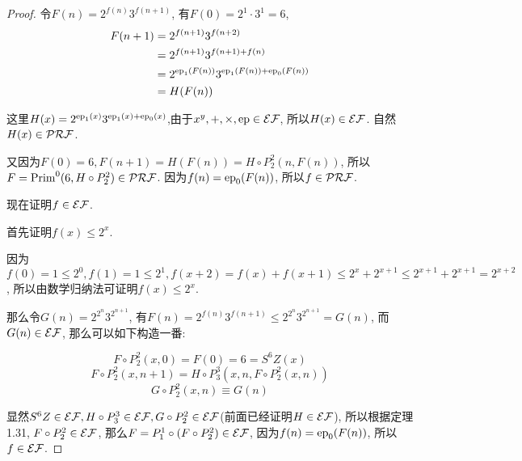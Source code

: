 \begin{proof}
    令$F(n)=2^{f(n)}3^{f(n+1)}$, 有$F(0)=2^1\cdot 3^1=6$,
    $$\begin{aligned}
        F(n+1)&=2^{f(n+1)}3^{f(n+2)}\\
        &=2^{f(n+1)}3^{f(n+1)+f(n)}\\
        &=2^{\mathrm{ep}_1(F(n))}3^{\mathrm{ep}_1(F(n))+\mathrm{ep}_0(F(n))}\\
        &=H(F(n))
    \end{aligned}$$
	
    这里$H(x)=2^{\mathrm{ep}_1(x)}3^{\mathrm{ep}_1(x)+\mathrm{ep}_0(x)}$,由于$x^y,+,\times,\mathrm{ep}\in\mathcal{EF}$, 所以$H(x)\in\mathcal{EF}$. 自然$H(x)\in\mathcal{PRF}$.

    又因为$F(0)=6,F(n+1)=H(F(n))=H\circ P_2^2(n,F(n))$, 所以$F=\mathrm{Prim}^0(6,H\circ P_2^2)\in\mathcal{PRF}$. 因为$f(n)=\mathrm{ep}_0(F(n))$, 所以$f\in\mathcal{PRF}$.

    现在证明$f\in\mathcal{EF}$.

    首先证明$f(x)\leqslant 2^x$.
    
    因为$f(0)=1\leqslant2^0,f(1)=1\leqslant2^1,f(x+2)=f(x)+f(x+1)\leqslant2^x+2^{x+1}\leq2^{x+1}+2^{x+1}=2^{x+2}$, 所以由数学归纳法可证明$f(x)\leqslant 2^x$.

    那么令$G(n)=2^{2^n}3^{2^{n+1}}$, 有$F(n)=2^{f(n)}3^{f(n+1)}\leqslant2^{2^n}3^{2^{n+1}}=G(n)$, 而$G(n)\in\mathcal{EF}$, 那么可以如下构造一番:

    $$F\circ P^2_2(x, 0)=F(0)=6=S^6Z(x)$$
    $$F\circ P^2_2(x, n+1)=H\circ P_3^3(x, n, F\circ P^2_2(x,n))$$
    $$G\circ P^2_2(x, n)\equiv G(n)$$

    显然$S^6Z\in\mathcal{EF},H\circ P_3^3\in\mathcal{EF},G\circ P^2_2\in\mathcal{EF}$(前面已经证明$H\in\mathcal{EF}$), 所以根据定理1.31, $F\circ P^2_2\in\mathcal{EF}$, 那么$F=P_1^1\circ (F\circ P^2_2)\in\mathcal{EF}$, 因为$f(n)=\mathrm{ep}_0(F(n))$, 所以$f\in\mathcal{EF}$.
\end{proof}